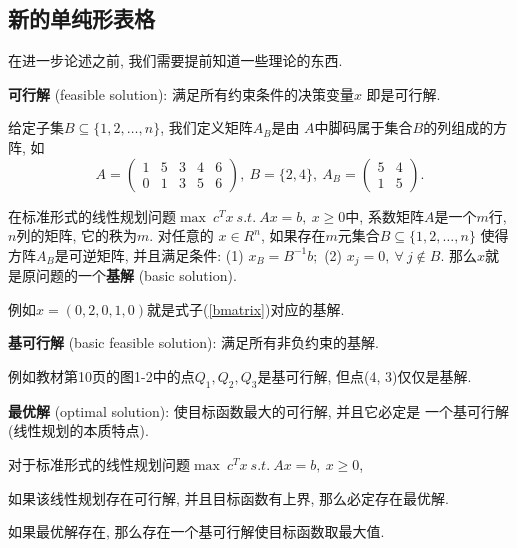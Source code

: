 \documentclass[a4paper,12pt]{article}
\begin{document}
\begin{CJK*}{UTF8}{gbsn}
\subsection{新的单纯形表格}
在进一步论述之前, 我们需要提前知道一些理论的东西. 

\begin{define}
\textbf{可行解} (feasible solution): 满足所有约束条件的决策变量$x$
即是可行解. 
\end{define}

给定子集$B \subseteq \{1, 2, \dots, n\}$, 我们定义矩阵$A_{B}$是由
$A$中脚码属于集合$B$的列组成的方阵, 如
\begin{equation}
A = \begin{pmatrix}
1 & 5 & 3 & 4 & 6\\
0 & 1 & 3 & 5 & 6
\end{pmatrix},~
B = \{2, 4\},~A_{B} = \begin{pmatrix}
5 & 4\\
1 & 5
\end{pmatrix}
\label{bmatrix}. 
\end{equation}
\begin{define}
在标准形式的线性规划问题$\max~c^{T} x~s.t.~Ax = b, ~x \geq 0$中, 
系数矩阵$A$是一个$m$行, $n$列的矩阵, 它的秩为$m$. 对任意的
$x \in R^{n}$, 如果存在$m$元集合$B \subseteq \{1, 2, \dots, n\}$
使得方阵$A_{B}$是可逆矩阵, 并且满足条件: (1) $x_{B} = B^{-1} b;$
(2) $x_{j} = 0,~\forall~j \notin B. $ 那么$x$就是原问题的一个\textbf{基解} 
(basic solution). 
\end{define}
例如$x = (0, 2, 0, 1, 0)$就是式子(\ref{bmatrix})对应的基解. 
\begin{define}
\textbf{基可行解} (basic feasible solution): 满足所有非负约束的基解. 
\end{define}
例如教材\cite{or}第10页的图1-2中的点$Q_{1}, Q_{2}, Q_{3}$是基可行解, 
但点(4, 3)仅仅是基解. 
\begin{define}
\textbf{最优解} (optimal solution): 使目标函数最大的可行解, 并且它必定是
一个基可行解(线性规划的本质特点).	
\end{define}

\begin{thm}
对于标准形式的线性规划问题$\max~c^{T} x~s.t.~Ax = b, ~x \geq 0$, 
\begin{compactenum}[(1)]
\item 如果该线性规划存在可行解, 并且目标函数有上界, 那么必定存在最优解. 
\item 如果最优解存在, 那么存在一个基可行解使目标函数取最大值. 
\end{compactenum}
\end{thm}


\end{CJK*}
\end{document}
